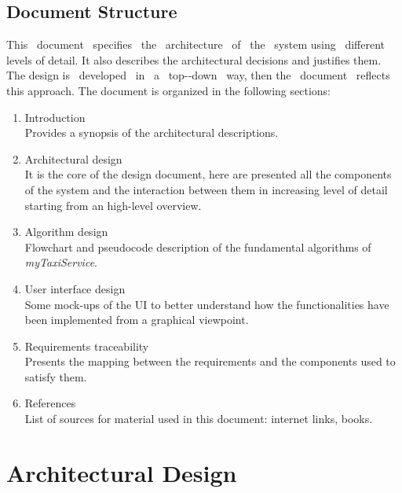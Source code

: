\documentclass[a4paper,11pt]{report} %
\newcommand{\mts}{\mbox{\normalfont\itshape myTaxiService}}
\begin{document}
	\subsection{Document Structure} This  document  specifies  the  architecture  of  the  system  using  different levels of detail. It also describes the architectural decisions and justifies them. The design is  developed  in  a  top-­‐down  way, then the  document  reflects this approach.
	The document is organized in the following sections:
	\begin{enumerate}
		\item Introduction\\
		Provides a synopsis of the architectural descriptions.
		\item Architectural design\\
		It is the core of the design document, here are presented all the components of the system and the interaction between them in increasing level of detail starting from an high-level overview.		
		\item Algorithm design\\
		Flowchart and pseudocode description of the fundamental algorithms of \mts{}. 
		\item User interface design\\
		Some mock-ups of the UI to better understand how the functionalities have been implemented from a graphical viewpoint.
		\item Requirements traceability\\
		Presents the mapping between the requirements and the components used to satisfy them.
		\item References\\
		List of sources for material used in this document: internet links, books.
		
	\end{enumerate} 
	
	\pagebreak
	\section{Architectural Design}
	
\end{document}
